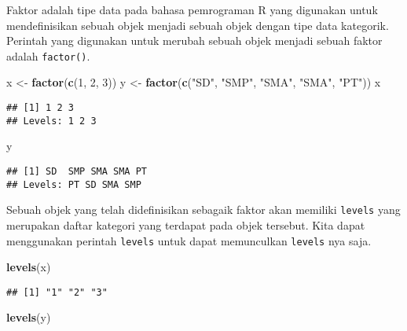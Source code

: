\documentclass[
]{book}
\newenvironment{Shaded}{\begin{snugshade}}{\end{snugshade}}
\newcommand{\DecValTok}[1]{\textcolor[rgb]{0.00,0.00,0.81}{#1}}
\newcommand{\KeywordTok}[1]{\textcolor[rgb]{0.13,0.29,0.53}{\textbf{#1}}}
\newcommand{\NormalTok}[1]{#1}
\newcommand{\StringTok}[1]{\textcolor[rgb]{0.31,0.60,0.02}{#1}}
\begin{document}
Faktor adalah tipe data pada bahasa pemrograman R yang digunakan untuk mendefinisikan sebuah objek menjadi sebuah objek dengan tipe data kategorik. Perintah yang digunakan untuk merubah sebuah objek menjadi sebuah faktor adalah \texttt{factor()}.

\begin{Shaded}
\begin{Highlighting}[]
\NormalTok{x <-}\StringTok{ }\KeywordTok{factor}\NormalTok{(}\KeywordTok{c}\NormalTok{(}\DecValTok{1}\NormalTok{, }\DecValTok{2}\NormalTok{, }\DecValTok{3}\NormalTok{))}
\NormalTok{y <-}\StringTok{ }\KeywordTok{factor}\NormalTok{(}\KeywordTok{c}\NormalTok{(}\StringTok{"SD"}\NormalTok{, }\StringTok{"SMP"}\NormalTok{, }\StringTok{"SMA"}\NormalTok{, }\StringTok{"SMA"}\NormalTok{, }\StringTok{"PT"}\NormalTok{))}
\NormalTok{x}
\end{Highlighting}
\end{Shaded}

\begin{verbatim}
## [1] 1 2 3
## Levels: 1 2 3
\end{verbatim}

\begin{Shaded}
\begin{Highlighting}[]
\NormalTok{y}
\end{Highlighting}
\end{Shaded}

\begin{verbatim}
## [1] SD  SMP SMA SMA PT 
## Levels: PT SD SMA SMP
\end{verbatim}

Sebuah objek yang telah didefinisikan sebagaik faktor akan memiliki \texttt{levels} yang merupakan daftar kategori yang terdapat pada objek tersebut. Kita dapat menggunakan perintah \texttt{levels} untuk dapat memunculkan \texttt{levels} nya saja.

\begin{Shaded}
\begin{Highlighting}[]
\KeywordTok{levels}\NormalTok{(x)}
\end{Highlighting}
\end{Shaded}

\begin{verbatim}
## [1] "1" "2" "3"
\end{verbatim}

\begin{Shaded}
\begin{Highlighting}[]
\KeywordTok{levels}\NormalTok{(y)}
\end{Highlighting}
\end{Shaded}
\end{document}

